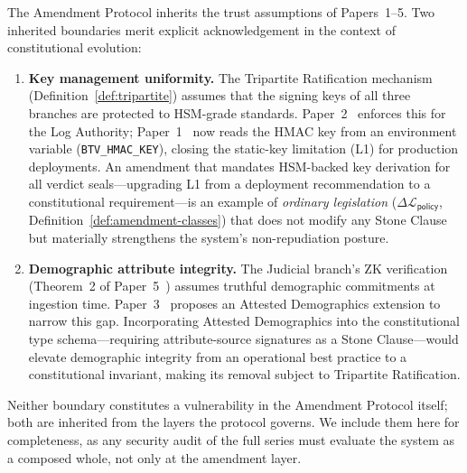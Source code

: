 The Amendment Protocol inherits the trust assumptions of Papers~1--5.
Two inherited boundaries merit explicit acknowledgement in the
context of constitutional evolution:

\begin{enumerate}
\item \textbf{Key management uniformity.} The Tripartite
Ratification mechanism (Definition~\ref{def:tripartite}) assumes
that the signing keys of all three branches are protected to
HSM-grade standards. Paper~2~\cite{btv-t-repo} enforces this for
the Log Authority; Paper~1~\cite{btv2026} now reads the HMAC key
from an environment variable (\texttt{BTV\_HMAC\_KEY}), closing
the static-key limitation (L1) for production deployments.
An amendment that mandates HSM-backed key derivation for all
verdict seals---upgrading L1 from a deployment recommendation to a
constitutional requirement---is an example of
\emph{ordinary legislation} ($\Delta\mathcal{L}_{\mathsf{policy}}$,
Definition~\ref{def:amendment-classes}) that does not modify any
Stone Clause but materially strengthens the system's
non-repudiation posture.

\item \textbf{Demographic attribute integrity.} The Judicial
branch's ZK verification (Theorem~2 of
Paper~5~\cite{btv-cc}) assumes truthful demographic commitments
at ingestion time. Paper~3~\cite{btv-ar2026} proposes an Attested
Demographics extension to narrow this gap. Incorporating Attested
Demographics into the constitutional type schema---requiring
attribute-source signatures as a Stone Clause---would elevate
demographic integrity from an operational best practice to a
constitutional invariant, making its removal subject to Tripartite
Ratification.
\end{enumerate}

\noindent Neither boundary constitutes a vulnerability in the
Amendment Protocol itself; both are inherited from the layers the
protocol governs. We include them here for completeness, as any
security audit of the full series must evaluate the system as a
composed whole, not only at the amendment layer.
